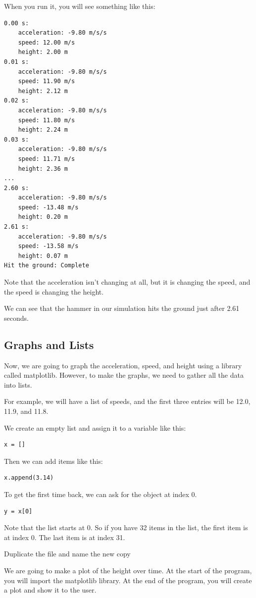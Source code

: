 When you run it, you will see something like this:
\begin{Verbatim}
0.00 s:
	acceleration: -9.80 m/s/s
	speed: 12.00 m/s
	height: 2.00 m
0.01 s:
	acceleration: -9.80 m/s/s
	speed: 11.90 m/s
	height: 2.12 m
0.02 s:
	acceleration: -9.80 m/s/s
	speed: 11.80 m/s
	height: 2.24 m
0.03 s:
	acceleration: -9.80 m/s/s
	speed: 11.71 m/s
	height: 2.36 m
...
2.60 s:
	acceleration: -9.80 m/s/s
	speed: -13.48 m/s
	height: 0.20 m
2.61 s:
	acceleration: -9.80 m/s/s
	speed: -13.58 m/s
	height: 0.07 m
Hit the ground: Complete
\end{Verbatim}

Note that the acceleration isn't changing at all, but it is changing
the speed, and the speed is changing the height.

We can see that the hammer in our simulation hits the ground just
after 2.61 seconds.

\subsection{Graphs and Lists}

Now, we are going to graph the acceleration, speed, and height using a
library called matplotlib. However, to make the graphs, we
need to gather all the data into lists.

For example, we will have a list of speeds, and the first three
entries will be 12.0, 11.9, and 11.8.

We create an empty list and assign it to a variable like this:
\begin{Verbatim}
x = []
\end{Verbatim}

Then we can add items like this:
\begin{Verbatim}
x.append(3.14)
\end{Verbatim}

To get the first time back, we can ask for the object at index 0.
\begin{Verbatim}
y = x[0]
\end{Verbatim}
Note that the list starts at 0.  So if you have 32 items in the list,
the first item is at index 0. The last item is at index 31.

Duplicate the file  and name the new copy 

We are going to make a plot of the height over time. At the start of the program, you will import the
matplotlib library.  At the end of the program, you will create a plot and show it to the user.

